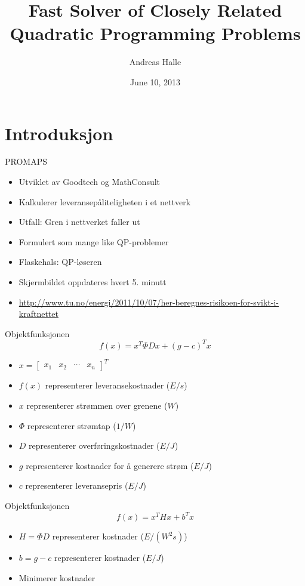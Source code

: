 \documentclass{beamer}
\title[Fast Solver of Closely Related Quadratic Programming Problems]
      {Fast Solver of Closely Related Quadratic Programming Problems}
\author{Andreas Halle}
\date{June 10, 2013}
\begin{document}
\begin{frame}
\titlepage
\end{frame}



\section{Introduksjon}



\begin{frame}{PROMAPS}
\begin{itemize}
\item Utviklet av Goodtech og MathConsult
\item Kalkulerer leveransepåliteligheten i et nettverk
\item Utfall: Gren i nettverket faller ut
\item Formulert som mange like QP-problemer
\item Flaskehals: QP-løseren
\item Skjermbildet oppdateres hvert 5. minutt
\item \url{http://www.tu.no/energi/2011/10/07/her-beregnes-risikoen-for-svikt-i-kraftnettet}
\end{itemize}
\end{frame}



\begin{frame}{Objektfunksjonen}
\[
f(x) = x^T \Phi D x + (g - c)^T x
\]
\begin{itemize}
\item $x = \left[ \begin{array}{cccc} x_1 & x_2 & \cdots & x_n \end{array} \right]^T$
\item $f(x)$ representerer leveransekostnader ($E/s$)
\item $x$ representerer strømmen over grenene ($W$)
\item $\Phi$ representerer strømtap ($1/W$)
\item $D$ representerer overføringskostnader ($E/J$)
\item $g$ representerer kostnader for å generere strøm ($E/J$)
\item $c$ representerer leveransepris ($E/J$)
\end{itemize}
\end{frame}



\begin{frame}{Objektfunksjonen}
\[
f(x) = x^T H x + b^T x
\]
\begin{itemize}
\item $H = \Phi D$ representerer kostnader ($E/(W^2 s)$)
\item $b = g - c$ representerer kostnader ($E/J$)
\item Minimerer kostnader
\end{itemize}
\end{frame}
\end{document}
